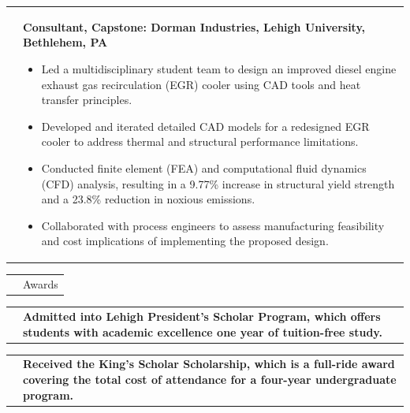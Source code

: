 \documentclass[11pt,letterpaper]{article}
\makeatletter
\newcommand{\CVSection}[1]{%
  \vspace{0.4em}
  \noindent
  \begin{tabularx}{\textwidth}{@{}p{0.82in}@{\hspace{0.14in}}X@{}}
    \raisebox{-1.45ex}{\color{rulecolor}\rule{0.82in}{4.2pt}} &
    {\fontsize{14}{16}\selectfont\color{cvcolor}#1}\\
  \end{tabularx}
  \vspace{0.55em}
}
\newcommand{\CVItem}[2]{%
  \begin{tabularx}{\textwidth}{@{}p{0.83in}@{\hspace{0.15in}}X@{}}
    \raggedleft{#1} & #2\\[3pt]
  \end{tabularx}
}
\makeatother
\begin{document}
\CVItem{\hspace{-5mm}\mbox{Jan--Dec 2020}}{\textbf{Consultant, Capstone: Dorman Industries, Lehigh University, Bethlehem, PA} \begin{itemize}
  \item Led a multidisciplinary student team to design an improved diesel engine exhaust gas recirculation (EGR) cooler using CAD tools and heat transfer principles.
   \item Developed and iterated detailed CAD models for a redesigned EGR cooler to address thermal and structural performance limitations.
 \item Conducted finite element (FEA) and computational fluid dynamics (CFD) analysis, resulting in a 9.77\% increase in structural yield strength and a 23.8\% reduction in noxious emissions.
  \item Collaborated with process engineers to assess manufacturing feasibility and cost implications of implementing the proposed design.
\end{itemize}}

\CVSection{Awards}

\CVItem{\hspace{-5mm}\mbox{2021}}{\textbf{Admitted into Lehigh President's Scholar Program, which offers students with academic excellence one year of tuition-free study.}}
\CVItem{\hspace{-5mm}\mbox{2017}}{\textbf{Received the King's Scholar Scholarship, which is a full-ride award covering the total cost of attendance for a four-year undergraduate program.}}

\end{document}

